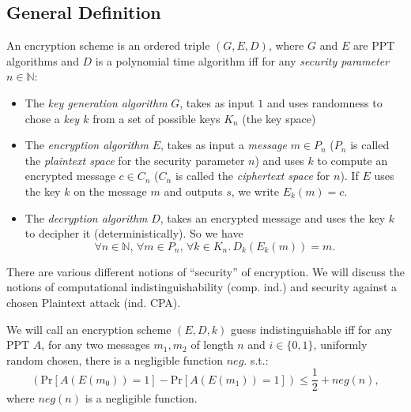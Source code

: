 \subsection{General Definition}

\begin{definition}
 An encryption scheme is an ordered triple $(G, E, D)$, where $G$ and $E$ are PPT algorithms and $D$ is a polynomial time algorithm iff for any \emph{security parameter} $n\in\mathbb{N}$:
 \begin{itemize}
  \item The \emph{key generation algorithm} $G$, takes as input $1$ and uses randomness to chose a \emph{key $k$} from a set of possible keys $K_n$ (the key space)
  \item The \emph{encryption algorithm} $E$, takes as input a \emph{message} $m\in P_n$ ($P_n$ is called the \emph{plaintext space} for the security parameter $n$) and uses $k$ to compute an encrypted message $c\in C_n$ ($C_n$ is called the \emph{ciphertext space} for $n$). If $E$ uses the key $k$ on the message $m$ and outputs $s$, we write $E_k(m)=c$.
  \item The \emph{decryption algorithm} $D$, takes an encrypted message and uses the key $k$ to decipher it (deterministically). So we have $$\forall n\in\mathbb{N},\,\forall m\in P_n,\,\forall k \in K_n.\,D_k(E_k(m))=m.$$
 \end{itemize}
\end{definition}

There are various different notions of ``security'' of encryption. We will discuss the notions of %
computational indistinguishability (comp. ind.) and security against a chosen Plaintext attack (ind. CPA). 
\begin{definition}
 We will call an encryption scheme $(E,D,k)$ guess indistinguishable iff for any PPT $A$, for any two messages $m_1, m_2$ of length $n$ and $i\in \{0,1\}$, uniformly random chosen, there is a negligible function $neg.$ s.t.:
 \[(\mathrm{Pr}\left[A(E(m_0))=1\right]-\mathrm{Pr}\left[A(E(m_1))=1\right])\leq \frac{1}{2}+neg(n), \] where $neg(n)$ is a negligible function.
\end{definition}

